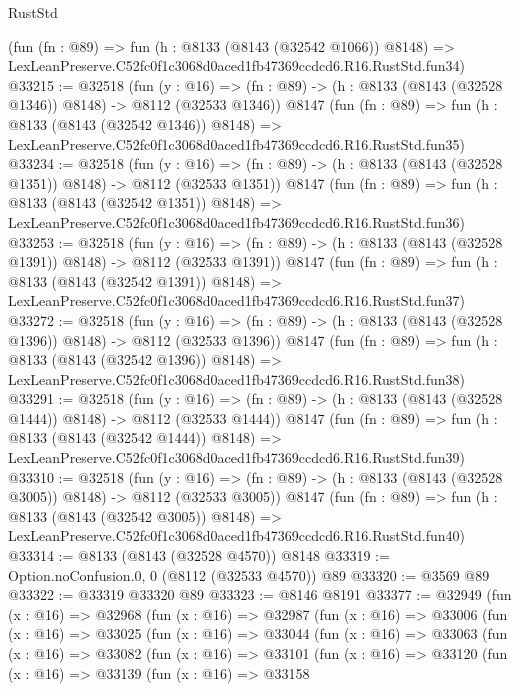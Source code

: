 \begin{lexlean}{RustStd}
\begin{coremodule}
    (fun (fn : @89) =>
    fun (h : @8133 (@8143 (@32542 @1066)) @8148) =>
    LexLeanPreserve.C52fc0f1c3068d0aced1fb47369ccdcd6.R16.RustStd.fun34)
@33215 := @32518
    (fun (y : @16) =>
    (fn : @89) -> (h : @8133 (@8143 (@32528 @1346)) @8148) -> @8112 (@32533 @1346))
    @8147
    (fun (fn : @89) =>
    fun (h : @8133 (@8143 (@32542 @1346)) @8148) =>
    LexLeanPreserve.C52fc0f1c3068d0aced1fb47369ccdcd6.R16.RustStd.fun35)
@33234 := @32518
    (fun (y : @16) =>
    (fn : @89) -> (h : @8133 (@8143 (@32528 @1351)) @8148) -> @8112 (@32533 @1351))
    @8147
    (fun (fn : @89) =>
    fun (h : @8133 (@8143 (@32542 @1351)) @8148) =>
    LexLeanPreserve.C52fc0f1c3068d0aced1fb47369ccdcd6.R16.RustStd.fun36)
@33253 := @32518
    (fun (y : @16) =>
    (fn : @89) -> (h : @8133 (@8143 (@32528 @1391)) @8148) -> @8112 (@32533 @1391))
    @8147
    (fun (fn : @89) =>
    fun (h : @8133 (@8143 (@32542 @1391)) @8148) =>
    LexLeanPreserve.C52fc0f1c3068d0aced1fb47369ccdcd6.R16.RustStd.fun37)
@33272 := @32518
    (fun (y : @16) =>
    (fn : @89) -> (h : @8133 (@8143 (@32528 @1396)) @8148) -> @8112 (@32533 @1396))
    @8147
    (fun (fn : @89) =>
    fun (h : @8133 (@8143 (@32542 @1396)) @8148) =>
    LexLeanPreserve.C52fc0f1c3068d0aced1fb47369ccdcd6.R16.RustStd.fun38)
@33291 := @32518
    (fun (y : @16) =>
    (fn : @89) -> (h : @8133 (@8143 (@32528 @1444)) @8148) -> @8112 (@32533 @1444))
    @8147
    (fun (fn : @89) =>
    fun (h : @8133 (@8143 (@32542 @1444)) @8148) =>
    LexLeanPreserve.C52fc0f1c3068d0aced1fb47369ccdcd6.R16.RustStd.fun39)
@33310 := @32518
    (fun (y : @16) =>
    (fn : @89) -> (h : @8133 (@8143 (@32528 @3005)) @8148) -> @8112 (@32533 @3005))
    @8147
    (fun (fn : @89) =>
    fun (h : @8133 (@8143 (@32542 @3005)) @8148) =>
    LexLeanPreserve.C52fc0f1c3068d0aced1fb47369ccdcd6.R16.RustStd.fun40)
@33314 := @8133 (@8143 (@32528 @4570)) @8148
@33319 := Option.noConfusion.{0, 0} (@8112 (@32533 @4570)) @89
@33320 := @3569 @89
@33322 := @33319 @33320 @89
@33323 := @8146 @8191
@33377 := @32949
    (fun (x : @16) =>
    @32968
      (fun (x : @16) =>
      @32987
        (fun (x : @16) =>
        @33006
          (fun (x : @16) =>
          @33025
            (fun (x : @16) =>
            @33044
              (fun (x : @16) =>
              @33063
                (fun (x : @16) =>
                @33082
                  (fun (x : @16) =>
                  @33101
                    (fun (x : @16) =>
                    @33120
                      (fun (x : @16) =>
                      @33139
                        (fun (x : @16) =>
                        @33158

\end{coremodule}
\end{lexlean}
